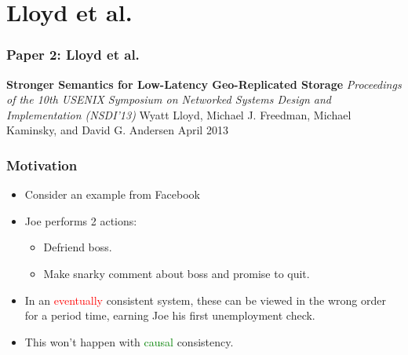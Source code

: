 \documentclass{beamer}
\begin{document}

\section{Lloyd et al.} 

\begin{frame}
\frametitle{Paper 2: Lloyd et al.}

\textbf{Stronger Semantics for Low-Latency Geo-Replicated Storage} \newline
\textit{Proceedings of the 10th USENIX Symposium on Networked Systems Design and Implementation (NSDI’13)} \newline
Wyatt Lloyd, Michael J. Freedman, Michael Kaminsky, and David G. Andersen \newline
April 2013 \newline

\end{frame}

\begin{frame}
\frametitle{Motivation}
\begin{itemize}

\item Consider an example from Facebook
\pause\item Joe performs 2 actions:
	\begin{itemize}
		\item Defriend boss.
		\item Make snarky comment about boss and promise to quit.
	\end{itemize}
\item In an \textcolor{red}{eventually} consistent system, these can be viewed in the wrong order for a period time, earning Joe his first unemployment check.
\item This won't happen with \textcolor{green}{causal} consistency.

\end{itemize}  
\end{frame}
\end{document}
